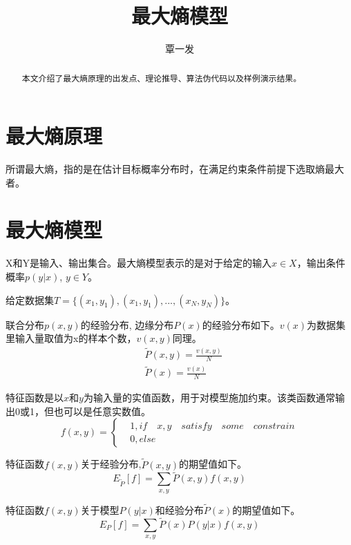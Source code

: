\documentclass{article}
\title{最大熵模型}
\author{覃一发}
\begin{document}
	
	\maketitle
	
	\begin{abstract}
		本文介绍了最大熵原理的出发点、理论推导、算法伪代码以及样例演示结果。
	\end{abstract}
	
	\section{最大熵原理}
	    所谓最大熵，指的是在估计目标概率分布时，在满足约束条件前提下选取熵最大者。
	
	
	\section{最大熵模型}
	    X和Y是输入、输出集合。最大熵模型表示的是对于给定的输入$ x\in X $，输出条件概率$ p(y|x) $, $ y\in Y $。
	
	    给定数据集$ T=\{(x_{1}, y_{1}),(x_{1}, y_{1}),...,(x_{N}, y_{N})\} $。
	
	    联合分布$ p(x, y) $的经验分布, 边缘分布$ P(x) $的经验分布如下。$ v(x) $为数据集里输入量取值为x的样本个数，$ v(x,y) $同理。
	\begin{equation}
		\begin{aligned}
			&\tilde{P}(x, y) = \frac{v(x,y)}{N} \\
			&\tilde{P}(x) = \frac{v(x)}{N} 
		\end{aligned}
	\end{equation}
	
	    特征函数是以$x$和$y$为输入量的实值函数，用于对模型施加约束。该类函数通常输出0或1，但也可以是任意实数值。
	\begin{equation}
		f(x, y) = \left\{
		\begin{aligned}
			&1, if\quad x, y\quad satisfy\quad some\quad constrain\\
			&0, else
		\end{aligned}
		\right.
	\end{equation}
	
	    特征函数$ f(x,y) $关于经验分布,$ \tilde{P}(x, y) $的期望值如下。
	\begin{equation}
		E_{\tilde{P}}[f]=\sum_{x,y}\tilde{P}(x,y)f(x,y)
	\end{equation}
	
	    特征函数$ f(x,y) $关于模型$ P(y|x) $和经验分布$ \tilde{P}(x) $的期望值如下。
	\begin{equation}
		E_{P}[f]=\sum_{x,y}\tilde{P}(x)P(y|x)f(x,y)
	\end{equation}
	
\end{document}
